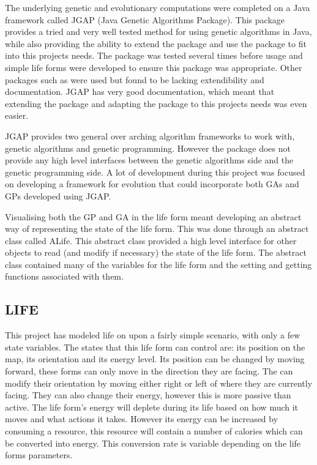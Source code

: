 \documentclass[10pt,twocolumn]{article}
\begin{document}
The underlying genetic and evolutionary computations were completed on a Java framework called JGAP (Java Genetic Algorithms Package).
This package provides a tried and very well tested method for using genetic algorithms in Java, while also providing the 
ability to extend the package and use the package to fit into this projects needs. The package was tested several times before usage
and simple life forms were developed to ensure this package was appropriate. Other packages such as %
were used but found to be lacking extendibility and documentation. JGAP has very good documentation, which meant that extending
the package and adapting the package to this projects needs was even easier.

JGAP provides two general over arching algorithm frameworks to work with, genetic algorithms and genetic programming. However
the package does not provide any high level interfaces between the genetic algorithms side and the genetic programming side. A 
lot of development during this project was focused on developing a framework for evolution that could incorporate both GAs and GPs developed
using JGAP. 

Visualising both the GP and GA in the life form meant developing an abstract way of representing the state of the life form. This was done
through an abstract class called ALife. This abstract class provided a high level interface for other objects to read (and modify if necessary)
the state of the life form. The abstract class contained many of the variables for the life form and the setting and getting functions 
associated with them. 

\subsection{LIFE}

This project has modeled life on upon a fairly simple scenario, with only a few state variables. The states that this life form
can control are: its position on the map, its orientation and its energy level. Its position can be changed by moving forward, these 
forms can only move in the direction they are facing. The can modify their orientation by moving either right or left of where they 
are currently facing. They can also change their energy, however this is more passive than active. The life form's energy will
deplete during its life based on how much it moves and what actions it takes. However its energy can be increased by consuming a 
resource, this resource will contain a number of calories which can be converted into energy. This conversion rate is variable
depending on the life forms parameters. 
\end{document}
